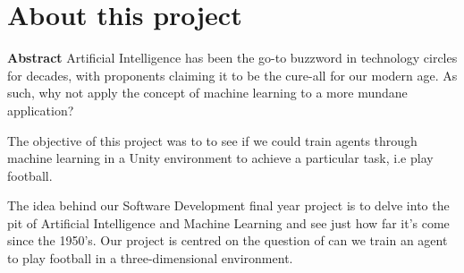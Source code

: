 
\chapter*{About this project}
\large\textbf{Abstract}
\newline
Artificial Intelligence has been the go-to buzzword in technology circles for decades, with proponents claiming it to be the cure-all for our modern age. As such, why not apply the concept of machine learning to a more mundane application?

The objective of this project was to to see if we could train agents through machine learning in a Unity environment to achieve a particular task, i.e play football.

The idea behind our Software Development final year project is to delve into the pit of Artificial Intelligence and Machine Learning and see just how far it’s come since the 1950’s. Our project is centred on the question of can we train an agent to play football in a three-dimensional environment.

